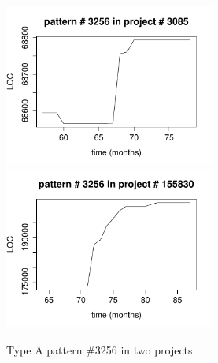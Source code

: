 \begin{figure}[H]
\caption{Type A pattern \#3256 in two projects}\label{figure:type_a_pattern}
\centering
	\includegraphics[width=196pt]{images/pattern_a_3085.pdf}
	\hspace{1em}
	\includegraphics[width=196pt]{images/pattern_a_155830.pdf}
\end{figure}